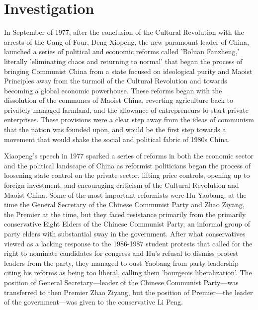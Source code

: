 \documentclass{paper}
\begin{document}
\section{Investigation}
\begin{doublespace}
In September of 1977, after the conclusion of the Cultural Revolution with the arrests of the Gang of Four, Deng Xiopeng, the new paramount leader of China, launched a series of political and economic reforms called 'Boluan Fanzheng,' literally 'eliminating chaos and returning to normal' that began the process of bringing Communist China from a state focused on ideological purity and Maoist Principles away from the turmoil of the Cultural Revolution and towards becoming a global economic powerhouse. These reforms began with the dissolution of the communes of Maoist China, reverting agriculture back to privately managed farmland, and the allowance of entrepreneurs to start private enterprises. These provisions were a clear step away from the ideas of communism that the nation was founded upon, and would be the first step towards a movement that would shake the social and political fabric of 1980s China.

Xiaopeng's speech in 1977 sparked a series of reforms in both the economic sector and the political landscape of China as reformist politicians began the process of loosening state control on the private sector, lifting price controls, opening up to foreign investment, and encouraging criticism of the Cultural Revolution and Maoist China. Some of the most important reformists were Hu Yaobang, at the time the General Secretary of the Chinese Communist Party and Zhao Ziyang, the Premier at the time, but they faced resistance primarily from the primarily conservative Eight Elders of the Chinese Communist Party, an informal group of party elders with substantial sway in the government. After what conservatives viewed as a lacking response to the 1986-1987 student protests that called for the right to nominate candidates for congress and Hu's refusal to dismiss protest leaders from the party, they managed to oust Yaobang from party leadership citing his reforms as being too liberal, calling them 'bourgeois liberalization'. The position of General Secretary---leader of the Chinese Communist Party---was transferred to then Premier Zhao Ziyang, but the position of Premier---the leader of the government---was given to the conservative Li Peng.


\end{doublespace}
\end{document}
